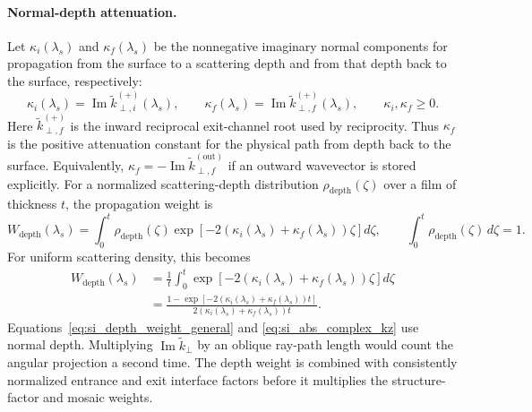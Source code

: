 \paragraph{Normal-depth attenuation.}
Let $\kappa_i(\lambda_s)$ and $\kappa_f(\lambda_s)$ be the nonnegative
imaginary normal components for propagation from the surface to a scattering
depth and from that depth back to the surface, respectively:
\begin{equation}
  \kappa_i(\lambda_s)=\operatorname{Im}\widetilde k_{\perp,i}^{(+)}(\lambda_s),
  \qquad
  \kappa_f(\lambda_s)=\operatorname{Im}\widetilde k_{\perp,f}^{(+)}(\lambda_s),
  \qquad
  \kappa_i,\kappa_f\geq0.
  \label{eq:si_kappa_if_lambda}
\end{equation}
Here \(\widetilde k_{\perp,f}^{(+)}\) is the inward reciprocal exit-channel root used by
reciprocity. Thus \(\kappa_f\) is the positive attenuation constant for the
physical path from depth back to the surface. Equivalently,
\(\kappa_f=-\operatorname{Im}\widetilde k_{\perp,f}^{(\mathrm{out})}\) if an outward
wavevector is stored explicitly.
For a normalized scattering-depth distribution $\rho_{\mathrm{depth}}(\zeta)$ over a film of
thickness $t$, the propagation weight is
\begin{equation}
  W_{\mathrm{depth}}(\lambda_s)=
  \int_0^t \rho_{\mathrm{depth}}(\zeta)
  \exp\!\left[-2\left(\kappa_i(\lambda_s)+\kappa_f(\lambda_s)\right)\zeta\right]d\zeta,
  \qquad
  \int_0^t\rho_{\mathrm{depth}}(\zeta)\,d\zeta=1.
  \label{eq:si_depth_weight_general}
\end{equation}
For uniform scattering density, this becomes
\begin{align}
  W_{\mathrm{depth}}(\lambda_s)
  &=
  \frac{1}{t}\int_0^t
  \exp\!\left[-2\left(\kappa_i(\lambda_s)+\kappa_f(\lambda_s)\right)\zeta\right] d\zeta\\
  &=
  \frac{
  1-\exp\!\left[-2\left(\kappa_i(\lambda_s)+\kappa_f(\lambda_s)\right)t\right]
  }
  {2\left(\kappa_i(\lambda_s)+\kappa_f(\lambda_s)\right)t}.
  \label{eq:si_abs_complex_kz}
\end{align}
Equations~\eqref{eq:si_depth_weight_general} and
\eqref{eq:si_abs_complex_kz} use normal depth. Multiplying
$\operatorname{Im}\widetilde k_\perp$ by an oblique ray-path length would count the angular
projection a second time. The depth weight is combined with consistently
normalized entrance and exit interface factors before it multiplies the
structure-factor and mosaic weights.

